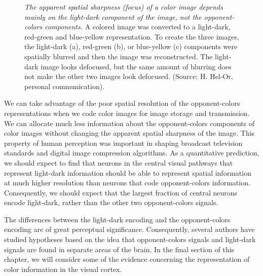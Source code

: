 \begin{figure}
\centerline{
}
\caption[Color image compression]{
{\em The apparent spatial sharpness (focus)
of a color image depends mainly on the light-dark
component of the image, not the opponent-colors components.}  A
colored image was converted to a light-dark, red-green and blue-yellow
representation.  To create the three images, the light-dark (a),
red-green (b), or blue-yellow (c) components were spatially blurred
and then the image was reconstructed.  The light-dark image looks
defocused, but the same amount of blurring does not make the other two
images look defocused.  (Source: H. Hel-Or, personal communication).
}
\label{f8:imageCompress}
\end{figure}

We can take advantage of the poor spatial resolution of the
opponent-colors representations when we code color images for image
storage and transmission.  We can allocate much less information about
the opponent-colors components of color images without changing the
apparent spatial sharpness of the image.  This property of human
perception was important in shaping broadcast television standards and
digital image compression algorithms.  As a quantitative prediction,
we should expect to find that neurons in the central visual pathways
that represent light-dark information should be able to represent
spatial information at much higher resolution than neurons that code
opponent-colors information.  Consequently, we should expect that the
largest fraction of central neurons encode light-dark, rather than the
other two opponent-colors signals.

The differences between the light-dark encoding and the
opponent-colors encoding are of great perceptual significance.
Consequently, several authors have studied hypotheses based on the
idea that opponent-colors signals and light-dark signals are found in
separate areas of the brain.  In the final section of this chapter, we
will consider some of the evidence concerning the representation of
color information in the visual cortex.
